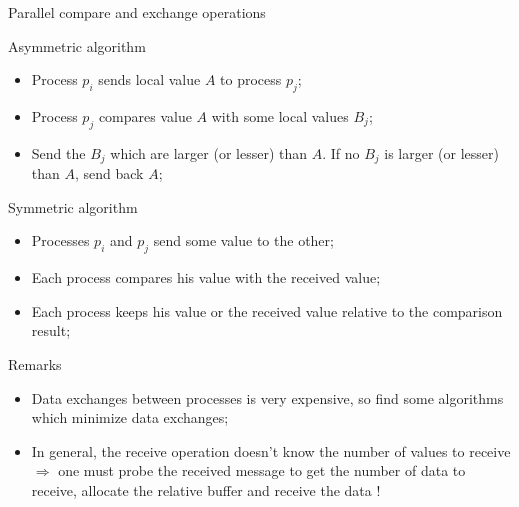 \documentclass[compress,10pt,aspectratio=169]{beamer}
\begin{document}
\begin{frame}[fragile]{Parallel compare and exchange operations}
  \scriptsize
  \begin{block}{\small Asymmetric algorithm}
    \begin{itemize}
    \item Process $p_{i}$ sends local value $A$ to process $p_{j}$;
    \item Process $p_{j}$ compares value $A$ with some local values $B_{j}$;
    \item Send the $B_{j}$ which are larger (or lesser) than $A$. If no $B_{j}$ is larger (or lesser) than $A$, send back $A$;
    \end{itemize}
  \end{block}

  \begin{block}{\small Symmetric algorithm}
    \begin{itemize}
    \item Processes $p_{i}$ and $p_{j}$ send some value to the other;
    \item Each process compares his value with the received value;
    \item Each process keeps his value or the received value relative to the comparison result;
    \end{itemize}
  \end{block}

  
  \begin{alertblock}{\small Remarks}
    \begin{itemize}
    \item Data exchanges between processes is very expensive, so find some algorithms which minimize data exchanges;
    \item In general, the receive operation doesn't know the number of values to receive $\Rightarrow$ one must probe the
          received message to get the number of data to receive, allocate the relative buffer and receive the data !
    \end{itemize}
  \end{alertblock}
\end{frame}
\end{document}
